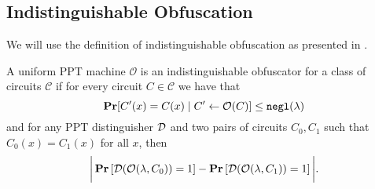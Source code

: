 \subsection{Indistinguishable Obfuscation}
We will use the definition of indistinguishable obfuscation as presented in \cite{garg2016candidate}.
\begin{definition}
	A uniform PPT machine $\mathcal{O}$ is an indistinguishable obfuscator for a class of circuits $\mathcal{C}$ if for every circuit $C \in \mathcal{C}$
	we have that
	\begin{equation*}
		\operatorname*{\mathbf{Pr}}[C'(x) = C(x) \mid C' \gets \mathcal{O}(C)] \leq \texttt{negl}(\lambda)
	\end{equation*}
	and for any PPT distinguisher $\mathcal{D}$ and two pairs of circuits $C_0, C_1$ such that
	$C_0(x) = C_1(x)$ for all $x$, then
	\begin{equation*}
		\bigg|\operatorname*{\mathbf{Pr}}\left[\mathcal{D}(\mathcal{O}(\lambda, C_0)) = 1\right] - \operatorname*{\mathbf{Pr}}\left[\mathcal{D}(\mathcal{O}(\lambda, C_1)) = 1\right]\bigg|.
	\end{equation*}
	
\end{definition}

